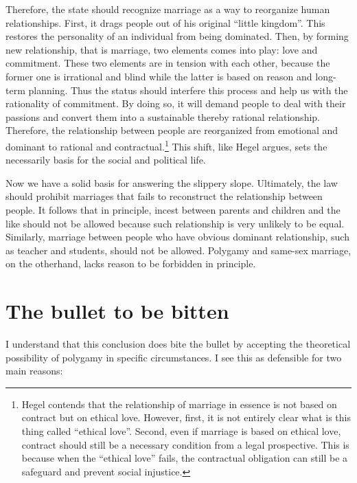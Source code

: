 \documentclass{article}
\begin{document}
Therefore, the state should recognize marriage as a way to reorganize human relationships. First, it drags people out of his original ``little kingdom''. This restores the personality of an individual from being dominated. Then, by forming new relationship, that is marriage, two elements comes into play: love and commitment. These two elements are in tension with each other, because the former one is irrational and blind while the latter is based on reason and long-term planning. Thus the status should interfere this process and help us with the rationality of commitment. By doing so, it will demand people to deal with their passions and convert them into a sustainable thereby rational relationship. Therefore, the relationship between people are reorganized from emotional and dominant to rational and contractual.\footnote{Hegel contends that the relationship of marriage in essence is not based on contract but on ethical love. However, first, it is not entirely clear what is this thing called ``ethical love''. Second, even if marriage is based on ethical love, contract should still be a necessary condition from a legal prospective. This is because when the ``ethical love'' fails, the contractual obligation can still be a safeguard and prevent social injustice.} This shift, like Hegel argues, sets the necessarily basis for the social and political life.

Now we have a solid basis for answering the slippery slope. Ultimately, the law should prohibit marriages that fails to reconstruct the relationship between people. It follows that in principle, incest between parents and children and the like should not be allowed because such relationship is very unlikely to be equal. Similarly, marriage between people who have obvious dominant relationship, such as teacher and students, should not be allowed. Polygamy and same-sex marriage, on the otherhand, lacks reason to be forbidden in principle. 

\section{The bullet to be bitten}

I understand that this conclusion does bite the bullet by accepting the theoretical possibility of polygamy in specific circumstances. I see this as defensible for two main reasons:
\end{document}
